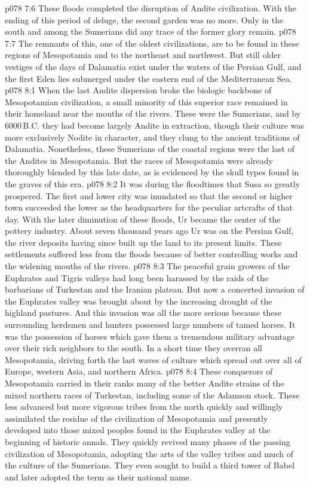 \vs p078 7:6 \pc These floods completed the disruption of Andite civilization. With the ending of this period of deluge, the second garden was no more. Only in the south and among the Sumerians did any trace of the former glory remain.
\vs p078 7:7 The remnants of this, one of the oldest civilizations, are to be found in these regions of Mesopotamia and to the northeast and northwest. But still older vestiges of the days of Dalamatia exist under the waters of the Persian Gulf, and the first Eden lies submerged under the eastern end of the Mediterranean Sea.
\vs p078 8:1 When the last Andite dispersion broke the biologic backbone of Mesopotamian civilization, a small minority of this superior race remained in their homeland near the mouths of the rivers. These were the Sumerians, and by 6000\,B.C. they had become largely Andite in extraction, though their culture was more exclusively Nodite in character, and they clung to the ancient traditions of Dalamatia. Nonetheless, these Sumerians of the coastal regions were the last of the Andites in Mesopotamia. But the races of Mesopotamia were already thoroughly blended by this late date, as is evidenced by the skull types found in the graves of this era.
\vs p078 8:2 It was during the floodtimes that Susa so greatly prospered. The first and lower city was inundated so that the second or higher town succeeded the lower as the headquarters for the peculiar artcrafts of that day. With the later diminution of these floods, Ur became the center of the pottery industry. About seven thousand years ago Ur was on the Persian Gulf, the river deposits having since built up the land to its present limits. These settlements suffered less from the floods because of better controlling works and the widening mouths of the rivers.
\vs p078 8:3 \pc The peaceful grain growers of the Euphrates and Tigris valleys had long been harassed by the raids of the barbarians of Turkestan and the Iranian plateau. But now a concerted invasion of the Euphrates valley was brought about by the increasing drought of the highland pastures. And this invasion was all the more serious because these surrounding herdsmen and hunters possessed large numbers of tamed horses. It was the possession of horses which gave them a tremendous military advantage over their rich neighbors to the south. In a short time they overran all Mesopotamia, driving forth the last waves of culture which spread out over all of Europe, western Asia, and northern Africa.
\vs p078 8:4 These conquerors of Mesopotamia carried in their ranks many of the better Andite strains of the mixed northern races of Turkestan, including some of the Adamson stock. These less advanced but more vigorous tribes from the north quickly and willingly assimilated the residue of the civilization of Mesopotamia and presently developed into those mixed peoples found in the Euphrates valley at the beginning of historic annals. They quickly revived many phases of the passing civilization of Mesopotamia, adopting the arts of the valley tribes and much of the culture of the Sumerians. They even sought to build a third tower of Babel and later adopted the term as their national name.
